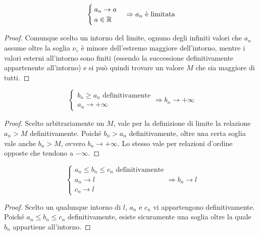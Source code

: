 \begin{prop}
	\[
		\begin{cases}
			a_n\to a \\
			a\in\mathbb{R}
		\end{cases}\Rightarrow a_n \text{ è limitata}
	\]
\end{prop}
\begin{proof}
	Comunque scelto un intorno del limite, ognuno degli infiniti valori che $a_n$ assume oltre la soglia $\nu_\varepsilon$ è minore dell'estremo maggiore dell'intorno, mentre i valori esterni all'intorno sono finiti (essendo la successione definitivamente appartenente all'intorno) e si può quindi trovare un valore $M$ che sia maggiore di tutti.
\end{proof}
\begin{teor}
	\label{suc:confr1}
	\[
		\begin{cases}
			b_n\geq a_n \text{ definitivamente} \\
			a_n\to+\infty
		\end{cases}\Rightarrow b_n\to+\infty
	\]
\end{teor}
\begin{proof}
	Scelto arbitrariamente un $M$, vale per la definizione di limite la relazione $a_n>M$ definitivamente. Poiché $b_n>a_n$ definitivamente, oltre una certa soglia vale anche $b_n>M$, ovvero $b_n\to+\infty$. Lo stesso vale per relazioni d'ordine opposte che tendono a $-\infty$.
\end{proof}
\begin{teor}
	\label{teor:confronto}
	\[
		\begin{cases}
			a_n\leq b_n \leq c_n \text{ definitivamente} \\
			a_n\to l                                     \\
			c_n\to l
		\end{cases}\Rightarrow b_n\to l
	\]
\end{teor}
\begin{proof}
	Scelto un qualunque intorno di $l$, $a_n$ e $c_n$ vi appartengono definitivamente. Poiché $a_n\leq b_n \leq c_n$ definitivamente, esiste sicuramente una soglia oltre la quale $b_n$ appartiene all'intorno.
\end{proof}


